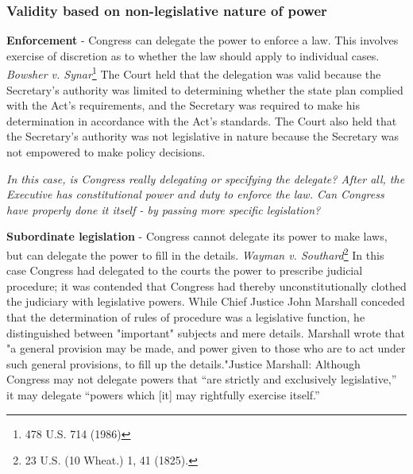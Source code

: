 \documentclass[../main.tex]{subfiles}
\begin{document}
\subsubsection{Validity based on non-legislative nature of power}

\textbf{Enforcement} - Congress can delegate the power to enforce a law. This involves exercise of discretion as to whether the law should apply to individual cases. \textit{Bowsher v. Synar}\footnote{478 U.S. 714 (1986)} The Court held that the delegation was valid because the Secretary’s authority was limited to determining whether the state plan complied with the Act’s requirements, and the Secretary was required to make his determination in accordance with the Act’s standards. The Court also held that the Secretary’s authority was not legislative in nature because the Secretary was not empowered to make policy decisions.  

\textit{In this case, is Congress really delegating or specifying the delegate? After all, the Executive has constitutional power and duty to enforce the law. Can Congress have properly done it itself - by passing more specific legislation?}


\textbf{Subordinate legislation} - Congress cannot delegate its power to make laws, but can delegate the power to fill in the details. \textit{Wayman v. Southard}\footnote{23 U.S. (10 Wheat.) 1, 41 (1825).} In this case Congress had delegated to the courts the power to prescribe judicial procedure; it was contended that Congress had thereby unconstitutionally clothed the judiciary with legislative powers. While Chief Justice John Marshall conceded that the determination of rules of procedure was a legislative function, he distinguished between "important" subjects and mere details. Marshall wrote that "a general provision may be made, and power given to those who are to act under such general provisions, to fill up the details."Justice Marshall:  Although Congress may not delegate powers that “are strictly and exclusively legislative,” it may delegate “powers which [it] may rightfully exercise itself.”
\end{document}
